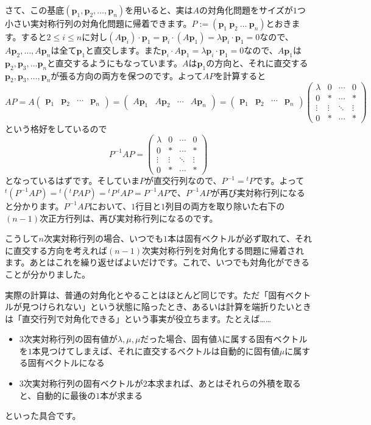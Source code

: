さて、この基底$(\bm{p}_1, \bm{p}_2, \ldots, \bm{p}_n)$を用いると、実は$A$の対角化問題をサイズが$1$つ小さい実対称行列の対角化問題に帰着できます。$P := ( \bm{p}_1 \ \bm{p}_2 \  \ldots \ \bm{p}_n )$とおきます。すると$2 \leq i \leq n$に対し$(A\bm{p}_i) \cdot \bm{p}_1 = \bm{p}_i \cdot (A\bm{p}_1) = \lambda \bm{p}_i \cdot \bm{p}_1 = 0$なので、$A\bm{p}_2, \ldots, A\bm{p}_n$は全て$\bm{p}_1$と直交します。また$\bm{p}_i \cdot A\bm{p}_1 = \lambda \bm{p}_i \cdot \bm{p}_1 = 0$なので、$A\bm{p}_1$は$\bm{p}_2, \bm{p}_3, \ldots \bm{p}_n$と直交するようにもなっています。$A$は$\bm{p}_1$の方向と、それに直交する$\bm{p}_2, \bm{p}_3, \ldots, \bm{p}_n$が張る方向の両方を保つのです。よって$AP$を計算すると
\[
AP = 
A
\begin{pmatrix}
\bm{p}_1 & \bm{p}_2 & \cdots & \bm{p}_n
\end{pmatrix}
=
\begin{pmatrix}
A\bm{p}_1 & A\bm{p}_2 & \cdots & A\bm{p}_n
\end{pmatrix}
=
\begin{pmatrix}
\bm{p}_1 & \bm{p}_2 & \cdots & \bm{p}_n
\end{pmatrix}
\begin{pmatrix}
\lambda & 0 & \cdots & 0 \\
0 & * & \cdots & * \\
\vdots & \vdots & \ddots & \vdots \\
0 & * & \cdots & *
\end{pmatrix}
\]
という格好をしているので
\[
P^{-1} A P = 
\begin{pmatrix}
\lambda & 0 & \cdots & 0 \\
0 & * & \cdots & * \\
\vdots & \vdots & \ddots & \vdots \\
0 & * & \cdots & *
\end{pmatrix}
\]
となっているはずです。そしていま$P$が直交行列なので、$P^{-1} = {}^tP$です。よって${}^t(P^{-1} A P) = {}^t({}^tP A P ) = {}^tP \, {}^t\!A P = P^{-1} A P$で、$P^{-1} A P$が再び実対称行列になると分かります。$P^{-1} A P$において、$1$行目と$1$列目の両方を取り除いた右下の$(n - 1)$次正方行列は、再び実対称行列になるのです。

こうして$n$次実対称行列の場合、いつでも$1$本は固有ベクトルが必ず取れて、それに直交する方向を考えれば$(n - 1)$次実対称行列を対角化する問題に帰着されます。あとはこれを繰り返せばよいだけです。これで、いつでも対角化ができることが分かりました。

実際の計算は、普通の対角化とやることはほとんど同じです。ただ「固有ベクトルが見つけられない」という状態に陥ったとき、あるいは計算を端折りたいときは「直交行列で対角化できる」という事実が役立ちます。たとえば……
\begin{itemize}
\item $3$次実対称行列の固有値が$\lambda, \mu, \mu$だった場合、固有値$\lambda$に属する固有ベクトルを$1$本見つけてしまえば、それに直交するベクトルは自動的に固有値$\mu$に属する固有ベクトルになる
\item $3$次実対称行列の固有ベクトルが$2$本求まれば、あとはそれらの外積を取ると、自動的に最後の$1$本が求まる
\end{itemize}
といった具合です。

